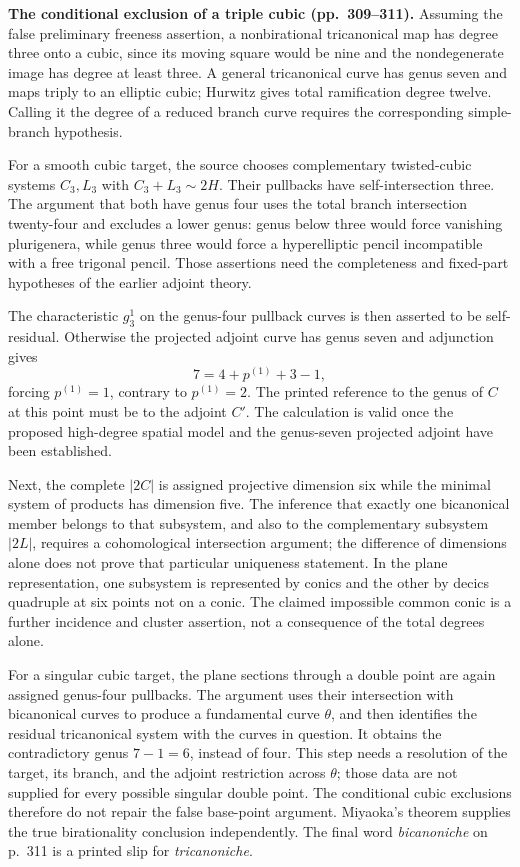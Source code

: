 \textbf{The conditional exclusion of a triple cubic (pp.~309--311).}
Assuming the false preliminary freeness assertion, a nonbirational tricanonical map has degree three onto a cubic, since its moving square would be nine and the nondegenerate image has degree at least three. A general tricanonical curve has genus seven and maps triply to an elliptic cubic; Hurwitz gives total ramification degree twelve. Calling it the degree of a reduced branch curve requires the corresponding simple-branch hypothesis.

For a smooth cubic target, the source chooses complementary twisted-cubic systems \(C_3,L_3\) with \(C_3+L_3\sim2H\). Their pullbacks have self-intersection three. The argument that both have genus four uses the total branch intersection twenty-four and excludes a lower genus: genus below three would force vanishing plurigenera, while genus three would force a hyperelliptic pencil incompatible with a free trigonal pencil. Those assertions need the completeness and fixed-part hypotheses of the earlier adjoint theory.

The characteristic \(g^1_3\) on the genus-four pullback curves is then asserted to be self-residual. Otherwise the projected adjoint curve has genus seven and adjunction gives
\[
7=4+p^{(1)}+3-1,
\]
forcing \(p^{(1)}=1\), contrary to \(p^{(1)}=2\). The printed reference to the genus of \(C\) at this point must be to the adjoint \(C'\). The calculation is valid once the proposed high-degree spatial model and the genus-seven projected adjoint have been established.

Next, the complete \(|2C|\) is assigned projective dimension six while the minimal system of products has dimension five. The inference that exactly one bicanonical member belongs to that subsystem, and also to the complementary subsystem \(|2L|\), requires a cohomological intersection argument; the difference of dimensions alone does not prove that particular uniqueness statement. In the plane representation, one subsystem is represented by conics and the other by decics quadruple at six points not on a conic. The claimed impossible common conic is a further incidence and cluster assertion, not a consequence of the total degrees alone.

For a singular cubic target, the plane sections through a double point are again assigned genus-four pullbacks. The argument uses their intersection with bicanonical curves to produce a fundamental curve \(\theta\), and then identifies the residual tricanonical system with the curves in question. It obtains the contradictory genus \(7-1=6\), instead of four. This step needs a resolution of the target, its branch, and the adjoint restriction across \(\theta\); those data are not supplied for every possible singular double point. The conditional cubic exclusions therefore do not repair the false base-point argument. Miyaoka's theorem supplies the true birationality conclusion independently. The final word \emph{bicanoniche} on p.~311 is a printed slip for \emph{tricanoniche}.

